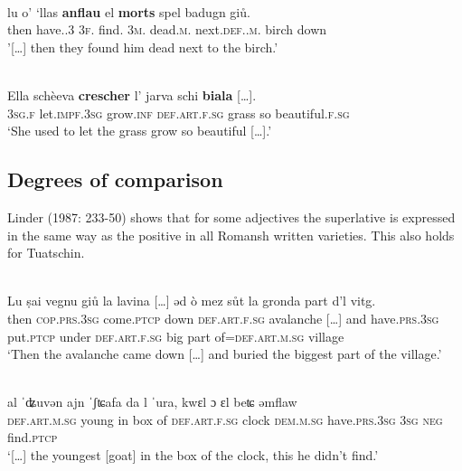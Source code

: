 {\ea\label{ex:1:adj}
\\
\gll lu o’ ‘llas \textbf{anflau} el \textbf{morts} spel badugn giů.\\
     then have.{\prs}.3{\pl} 3\textsc{f}.{\pl} find.{\ptcp} 3\textsc{m}.{\sg}  dead.\textsc{m}.{\sg}  next.\textsc{def}.{\art}.\textsc{m}.{\sg} birch down\\
\glt '[…] then they found him dead next to the birch.'
\z

\ea\label{}
\\
\gll    Ella schèeva \textbf{crescher} l’ jarva schi \textbf{biala} […].\\
    \textsc{3sg.f} let.\textsc{impf.3sg} grow.\textsc{inf} \textsc{def.art.f.sg} grass so beautiful.\textsc{f.sg} \\
\glt `She used to let the grass grow so beautiful […].'
\z
 


\subsection{Degrees of comparison}
Linder (1987: 233-50) shows that for some adjectives  the superlative is expressed in the same way as the positive in all Romansh written varieties. This also holds for Tuatschin.

\ea\label{}
\\
\gll    Lu ṣai vegnu giů la lavina […] ǝd ò mez sůt la gronda part d’l vitg.\\
     then \textsc{cop.prs.3sg} come.\textsc{ptcp} down \textsc{def.art.f.sg} avalanche […] and have.\textsc{prs.3sg} put.\textsc{ptcp} under \textsc{def.art.f.sg} big part of=\textsc{def.art.m.sg} village\\
\glt `Then the avalanche came down […] and buried the biggest part of the village.'
\z

\ea\label{}
\\
\gll    […] al ˈʥuvǝn ajn ˈʃʨafa da l ˈura, kwɛl ɔ ɛl beʨ ǝmflaw \\
  [...] \textsc{def.art.m.sg} young in box of \textsc{def.art.f.sg} clock \textsc{dem.m.sg} have.\textsc{prs.3sg} \textsc{3sg} \textsc{neg} find.\textsc{ptcp}\\
\glt `[…] the youngest [goat] in the box of the clock, this he didn’t find.'
\z



}
